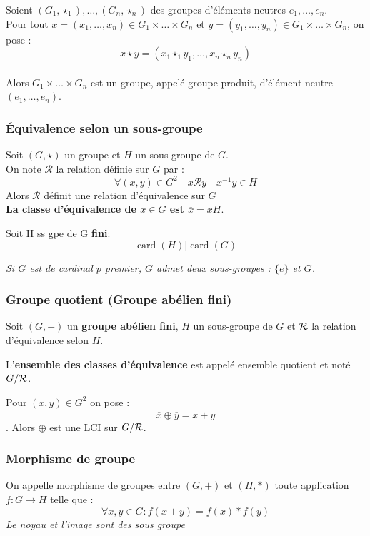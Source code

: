 \documentclass[a4paper,12pt]{report}
\newcommand{\Def}[2]{\begin{tcolorbox}[colback=white,colframe=CornflowerBlue, title=Définition : #1]#2\end{tcolorbox}}
\newcommand{\Thm}[2]{\begin{tcolorbox}[colback=white,colframe=Red!60, title=Théorème : #1]#2\end{tcolorbox}}
\DeclareMathOperator{\card}{card}
\begin{document}
\Def{Groupe produit}{
    Soient $(G_1,\star_1),\dots,(G_n,\star_n)$ des groupes d'éléments neutres $e_1,\dots,e_n$.\\
    Pour tout $x = (x_1,\dots,x_n) \in G_1 \times\dots\times G_n$ et $y = (y_1,\dots,y_n) \in G_1\times \dots \times G_n$, on pose :
    $$x \star y = (x_1 \star_1 y_1,\dots, x_n \star_n y_n)$$\\
    Alors $G_1 \times\dots \times G_n$ est un groupe, appelé groupe produit, d'élément neutre $(e_1,\dots,e_n)$.
}

\subsubsection{Équivalence selon un sous-groupe}
\Def{Relation d'équivalence à gauche}{
Soit $(G,\star)$ un groupe et $H$ un sous-groupe de $G$. \\On note $\mathcal R$ la relation définie sur $G$ par :
$$\forall (x,y) \in G^2 \quad x \mathcal{R} y \quad x^{-1}y \in H$$
Alors $\mathcal R$ définit une relation d'équivalence sur $G$ 
\\\textbf{La classe d'équivalence de $x \in G$ est $\overline{x} = xH$}.
}

\Thm{de Lagrange (HP)}{
Soit H ss gpe de G \textbf{fini}:
\[\card(H) |\card(G) \]

\textit{Si $G$ est de cardinal $p$ premier, $G$ admet deux sous-groupes : $\{e\}$ et $G$.}
}

\newpage
\subsubsection{Groupe quotient \textbf{(Groupe abélien fini)}}
Soit $(G,+)$ un \textbf{groupe abélien fini}, $H$ un sous-groupe de $G$ et $\cal R$ la relation d'équivalence selon $H$.

\Def{Ensemble quotient}{
L'\textbf{ensemble des classes d'équivalence} est appelé ensemble quotient et noté $G/\cal R$.
}

\Thm{Addition sur un ensemble quotient}{
    Pour $(x,y) \in G^2$ on pose :
    $$\overline{x}\oplus\overline{y}=\overline{x+y}$$.
    Alors $ \oplus$ est une LCI sur $G/ \cal R$.
}

\subsubsection{Morphisme de groupe}
\Def{Morphisme de groupe}{
On appelle morphisme de groupes entre $(G,+)$ et $(H,*)$ toute application $f:G\to H$ telle que :
\[\forall x,y\in G: f(x+y) = f(x)*f(y)\]
\textit{Le noyau et l'image sont des sous groupe}
}
\end{document}
